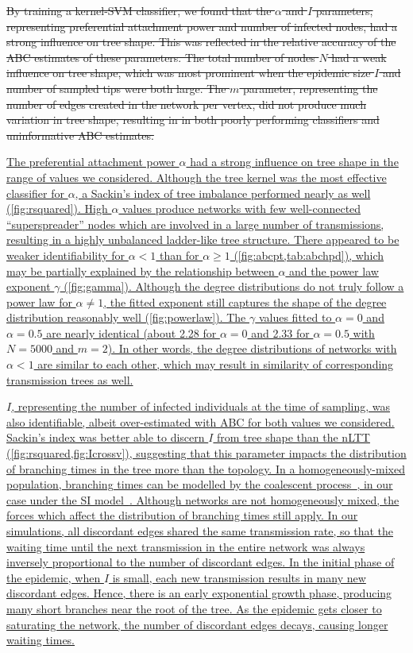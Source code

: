 \documentclass[12pt]{article}\usepackage[]{graphicx}\usepackage[]{color}
\let\mref\cref
\renewcommand{\cref}[1]{\mbox{\mref{#1}}}
\newcommand{\add}[1]{\color{blue} \uline{#1} \color{black}}
\newcommand{\del}[1]{\color{red} \sout{#1} \color{black}}
\begin{document}
\del{By training a kernel-SVM classifier, we found that the $\alpha$ and $I$
parameters, representing preferential attachment power and number of infected
nodes, had a strong influence on tree shape. This was reflected in the relative
accuracy of the ABC estimates of these parameters. The total number of
nodes $N$ had a weak influence on tree shape, which was most prominent when the
epidemic size $I$ and number of sampled tips were both large. The $m$
parameter, representing the number of edges created in the network per vertex,
did not produce much variation in tree shape, resulting in in both poorly
performing classifiers and uninformative ABC estimates.}

\add{The preferential attachment power $\alpha$ had a strong influence on tree
shape in the range of values we considered. Although the tree kernel was the
most effective classifier for $\alpha$, a Sackin's index of tree imbalance
performed nearly as well (\cref{fig:rsquared}). High $\alpha$ values produce
networks with few well-connected ``superspreader'' nodes which are involved in
a large number of transmissions, resulting in a highly unbalanced ladder-like
tree structure. There appeared to be weaker identifiability for $\alpha < 1$
than for $\alpha \geq 1$ (\cref{fig:abcpt,tab:abchpd}), which may be partially
explained by the relationship between $\alpha$ and the power law exponent
$\gamma$ (\cref{fig:gamma}). Although the degree distributions do not truly
follow a power law for $\alpha \neq 1$, the fitted exponent still captures the
shape of the degree distribution reasonably well (\cref{fig:powerlaw}). The
$\gamma$ values fitted to $\alpha = 0$ and $\alpha = 0.5$ are nearly identical
(about 2.28 for $\alpha = 0$ and 2.33 for $\alpha = 0.5$ with $N = 5000$ and $m
= 2$). In other words, the degree distributions of networks with $\alpha < 1$
are similar to each other, which may result in similarity of corresponding
transmission trees as well.}

\add{$I$, representing the number of infected individuals at the time of
sampling, was also identifiable, albeit over-estimated with ABC for both values
we considered. Sackin's index was better able to discern $I$ from tree shape
than the nLTT (\cref{fig:rsquared,fig:Icrossv}), suggesting that this parameter
impacts the distribution of branching times in the tree more than the topology.
In a homogeneously-mixed population, branching times can be modelled by the
coalescent process~\autocite{kingman1982coalescent}, in our case under the SI
model~\autocite{volz2009phylodynamics}. Although networks are not homogeneously
mixed, the forces which affect the distribution of branching times still apply.
In our simulations, all discordant edges shared the same
transmission rate, so that the waiting time until the next transmission in the
entire network was always inversely proportional to the number of discordant
edges. In the initial phase of the epidemic, when $I$ is small, each new
transmission results in many new discordant edges. Hence, there is an early
exponential growth phase, producing many short branches near the root of the
tree. As the epidemic gets closer to saturating the network, the number of
discordant edges decays, causing longer waiting times.}
\end{document}
